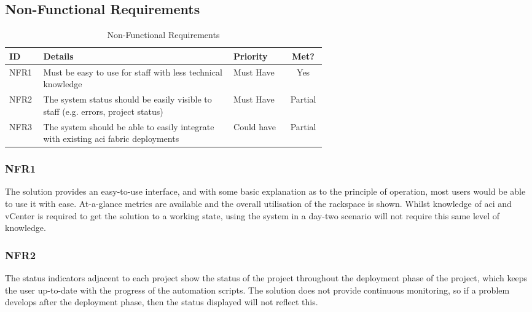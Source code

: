 \subsection{Non-Functional Requirements}

\begin{center}
    \begin{table}[H]
        \begin{tabular}{l p{0.6\linewidth} l c}
            \textbf{ID}             & \textbf{Details}
                                    & \textbf{Priority}
                                    & \textbf{Met?}
            \\ \hline
            NFR1                    & Must be easy to use for staff with less technical
            knowledge
                                    & Must Have
                                    & \cellcolor{green!25}Yes
            \\ \hline
            NFR2                    & The system status should be easily visible to staff (e.g.
            errors, project status) & Must Have
                                    & \cellcolor{yellow!25}Partial
                                                                             \\ \hline
            NFR3                    & The system should be able to easily integrate with existing \gls{aci} fabric deployments & Could have & \cellcolor{yellow!25}Partial
        \end{tabular}
        \caption{Non-Functional Requirements}
        \label{table:evaluation-non-functional-requirements}
    \end{table}
\end{center}

\subsubsection{NFR1}
The solution provides an easy-to-use interface, and with some basic explanation as to the principle of operation, most users would be able to use it with ease. At-a-glance metrics are available and the overall utilisation of the rackspace is shown. Whilst knowledge of \gls{aci} and vCenter is required to get the solution to a working state, using the system in a day-two scenario will not require this same level of knowledge.

\subsubsection{NFR2}
The status indicators adjacent to each project show the status of the project throughout the deployment phase of the project, which keeps the user up-to-date with the progress of the automation scripts. The solution does not provide continuous monitoring, so if a problem develops after the deployment phase, then the status displayed will not reflect this.

